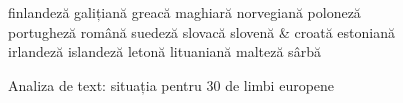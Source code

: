 \documentclass[]{../../metanetpaper}
\begin{document}
\begin{multicols}{2}
\begin{figure}[tb]
\begin{tabular}
finlandeză \newline 
galițiană \newline 
greacă \newline 
maghiară \newline 
norvegiană \newline 
poloneză \newline 
portugheză \newline 
română \newline 
suedeză \newline 
slovacă \newline 
slovenă \newline 
& \vspace*{0.5mm} croată \newline 
estoniană \newline 
irlandeză \newline 
islandeză \newline 
letonă \newline 
lituaniană \newline 
malteză \newline 
sârbă \\
\end{tabular}
\caption{Analiza de text: situația pentru 30 de limbi europene}
\label{fig:text_cluster_de}
\end{figure}


\end{multicols}
\end{document}
